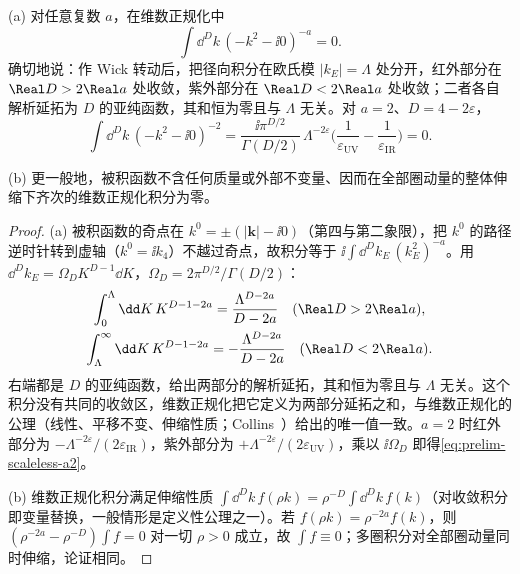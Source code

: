 \begin{lemma}[无标度积分为零]\label{lem:prelim-scaleless}
(a) 对任意复数 $a$，在维数正规化中
\begin{equation}\label{eq:prelim-scaleless}
\int\dd^Dk\,(-k^2-\ii0)^{-a}=0 .
\end{equation}
确切地说：作 Wick 转动后，把径向积分在欧氏模 $|k_E|=\Lambda$ 处分开，红外部分在 $\Real D>2\Real a$ 处收敛，紫外部分在 $\Real D<2\Real a$ 处收敛；二者各自解析延拓为 $D$ 的亚纯函数，其和恒为零且与 $\Lambda$ 无关。对 $a=2$、$D=4-2\varepsilon$，
\begin{equation}\label{eq:prelim-scaleless-a2}
\int\dd^Dk\,(-k^2-\ii0)^{-2}=\frac{\ii\pi^{D/2}}{\Gamma(D/2)}\,\Lambda^{-2\varepsilon}\Big(\frac1{\varepsilon_{\mathrm{UV}}}-\frac1{\varepsilon_{\mathrm{IR}}}\Big)=0 .
\end{equation}
\par
(b) 更一般地，被积函数不含任何质量或外部不变量、因而在全部圈动量的整体伸缩下齐次的维数正规化积分为零。
\end{lemma}

\begin{proof}
(a) 被积函数的奇点在 $k^0=\pm(|\mathbf k|-\ii0)$（第四与第二象限），把 $k^0$ 的路径逆时针转到虚轴（$k^0=\ii k_4$）不越过奇点，故积分等于 $\ii\int\dd^Dk_E\,(k_E^2)^{-a}$。用 $\dd^Dk_E=\Omega_DK^{D-1}\dd K$，$\Omega_D=2\pi^{D/2}/\Gamma(D/2)$：
\begin{gather*}
\int_0^\Lambda\dd K\,K^{D-1-2a}=\frac{\Lambda^{D-2a}}{D-2a}\quad(\Real D>2\Real a),\\
\int_\Lambda^\infty\dd K\,K^{D-1-2a}=-\frac{\Lambda^{D-2a}}{D-2a}\quad(\Real D<2\Real a).
\end{gather*}
右端都是 $D$ 的亚纯函数，给出两部分的解析延拓，其和恒为零且与 $\Lambda$ 无关。这个积分没有共同的收敛区，维数正规化把它定义为两部分延拓之和，与维数正规化的公理（线性、平移不变、伸缩性质；Collins~\cite[第~4.1~节]{Collins1984}）给出的唯一值一致。$a=2$ 时红外部分为 $-\Lambda^{-2\varepsilon}/(2\varepsilon_{\mathrm{IR}})$，紫外部分为 $+\Lambda^{-2\varepsilon}/(2\varepsilon_{\mathrm{UV}})$，乘以 $\ii\Omega_D$ 即得\cref{eq:prelim-scaleless-a2}。

(b) 维数正规化积分满足伸缩性质 $\int\dd^Dk\,f(\rho k)=\rho^{-D}\int\dd^Dk\,f(k)$（对收敛积分即变量替换，一般情形是定义性公理之一）。若 $f(\rho k)=\rho^{-2a}f(k)$，则 $(\rho^{-2a}-\rho^{-D})\int f=0$ 对一切 $\rho>0$ 成立，故 $\int f\equiv0$；多圈积分对全部圈动量同时伸缩，论证相同。
\end{proof}

